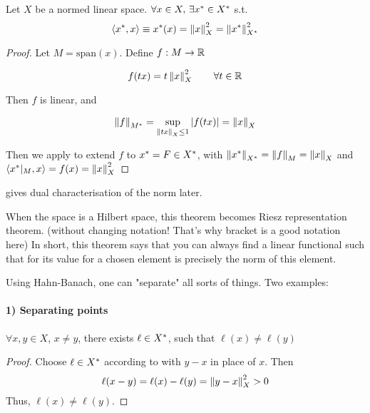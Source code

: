 \documentclass{article}
\begin{document}
\begin{theorem}
\label{existence of functional equals norm squared}\label{dual charaterization of norm}
	Let $X$ be a normed linear space. $\forall x\in X,\,\exists x^*\in {X}^*$ s.t. $$\left<{{x}^*},{x}\right>\equiv{x}^*(x)=\left\|{x}\right\|^2_X=\left\|{{x}^*}\right\|^2_{{X}^*}$$
\end{theorem}

\begin{proof}
	Let $M=\text{span}(x)$. Define $f: M \to \mathbb{R}$
	
	$$f(tx)=t\left\|{x}\right\|^2_X \qquad \forall t\in \mathbb{R}$$
	
	Then $f$ is linear, and 
	
	$$\left\|{f}\right\|_{{M}^*} = \sup_{\left\|{tx}\right\|_X \leq 1} |f(tx)| = \left\|{x}\right\|_X$$
	
	Then we apply  to extend $f$ to ${x}^*=F\in {X}^*$, with $\left\|{{x}^*}\right\|_{{X}^*}=\left\|{f}\right\|_M=\left\|{x}\right\|_X$ and $\left<{{x}^*|_{M}},{x}\right>=f(x)=\left\|{x}\right\|_X^2$
\end{proof}

\begin{remark}
     gives dual characterisation of the norm later.  
    \begin{unexaminable}
        When the space is a Hilbert space, this theorem becomes Riesz representation theorem. (without changing notation! That's why bracket is a good notation here) In short, this theorem says that you can always find a linear functional such that for its value for a chosen element is precisely the norm of this element.
    \end{unexaminable}
\end{remark}  

Using Hahn-Banach, one can "separate" all sorts of things. Two examples:  

\paragraph{1) Separating points}  

\begin{proposition}
$\forall x,y \in X$, $x\neq y$, there exists $\ell \in {X}^*$, such that $\ell(x) \neq \ell(y)$
\end{proposition}  

\begin{proof}
    Choose $\ell \in {X}^*$ according to  with $y-x$ in place of $x$.  
    Then  
    $$\ell (x-y) = \ell(x) - \ell(y) = \left\|{y-x}\right\|^2_X >0$$ 
    Thus, $\ell(x) \neq \ell(y)$.
\end{proof}
\end{document}
